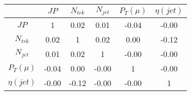 \begin{tabular}{|c|c|c|c|c|c|} 
\hline
 & $JP$ & $N_{trk}$ & $N_{jet}$ & $P_{T} (\mu)$ & $\eta (jet)$ \\ \hline
$JP$ & 1 & 0.02 & 0.01 & -0.04 & -0.00 \\
$N_{trk}$ & 0.02 & 1 & 0.02 & 0.00 & -0.12 \\
$N_{jet}$ & 0.01 & 0.02 & 1 & -0.00 & -0.00 \\
$P_{T} (\mu)$ & -0.04 & 0.00 & -0.00 & 1 & -0.00 \\
$\eta (jet)$ & -0.00 & -0.12 & -0.00 & -0.00 & 1 \\
\hline 
\end{tabular} 


